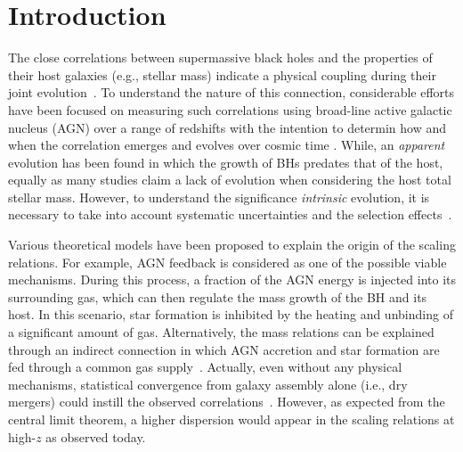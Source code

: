\documentclass[twocolumn]{aastex631}
\begin{document}
\section{Introduction} \label{sec:intro}
The close correlations between supermassive black holes and the properties of their host galaxies (e.g., stellar mass) indicate a physical coupling during their joint evolution~\citep{Mag++98, F+M00, M+H03, H+R04, Gul++09}. To understand the nature of this connection, considerable efforts have been focused on measuring such correlations using broad-line active galactic nucleus (AGN) over a range of redshifts with the intention to determin how and when the correlation emerges and evolves over cosmic time \citep[e.g.,][]{Peng2006a, Tre++07, Woo++08, Jahnke2009, Bennert11, Schramm2013, Park15, Mechtley2016, Ding2020, 2021arXiv210902751L}. While, an {\it apparent} evolution has been found in which the growth of BHs predates that of the host, equally as many studies claim a lack of evolution when considering the host total stellar mass. However, to understand the significance {\it intrinsic} evolution, it is necessary to take into account systematic uncertainties and the selection effects~\citep{Tre++07, Lauer2007, Schulze2014}. 

Various theoretical models have been proposed to explain the origin of the scaling relations. For example, AGN feedback is considered as one of the possible viable mechanisms. During this process, a fraction of the AGN energy is injected into its surrounding gas, which can then regulate the mass growth of the BH and its host. In this scenario, star formation is inhibited by the heating and unbinding of a significant amount of gas. Alternatively, the mass relations can be explained through an indirect connection in which AGN accretion and star formation are fed through a common gas supply~\citep{Cen2015, Menci2016}. Actually, even without any physical mechanisms, statistical convergence from galaxy assembly alone (i.e., dry mergers) could instill the observed correlations~\citep{Peng2007, Jahnke2011, Hirschmann2010}. However, as expected from the central limit theorem, a higher dispersion would appear in the scaling relations at high-$z$ as observed today. 
\end{document}
